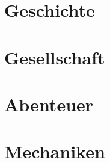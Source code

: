 \documentclass[a4paper,12pt,%
headsepline,%
numbers=noenddot,%
]{scrreprt}
\begin{document}
\part{Geschichte}


\part{Gesellschaft}







\part{Abenteuer}



\part{Mechaniken}





\end{document}
